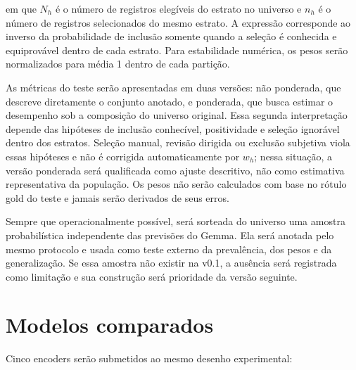 em que $N_h$ é o número de registros elegíveis do estrato no universo e $n_h$
é o número de registros selecionados do mesmo estrato. A expressão corresponde
ao inverso da probabilidade de inclusão somente quando a seleção é conhecida e
equiprovável dentro de cada estrato. Para estabilidade numérica, os pesos serão
normalizados para média 1 dentro de cada partição.

As métricas do teste serão apresentadas em duas versões: não ponderada, que
descreve diretamente o conjunto anotado, e ponderada, que busca estimar o
desempenho sob a composição do universo original. Essa segunda interpretação
depende das hipóteses de inclusão conhecível, positividade e seleção ignorável
dentro dos estratos. Seleção manual, revisão dirigida ou exclusão subjetiva
viola essas hipóteses e não é corrigida automaticamente por $w_h$; nessa situação,
a versão ponderada será qualificada como ajuste descritivo, não como estimativa
representativa da população. Os pesos não serão calculados com base no rótulo
gold do teste e jamais serão derivados de seus erros.

Sempre que operacionalmente possível, será sorteada do universo uma amostra
probabilística independente das previsões do Gemma. Ela será anotada pelo mesmo
protocolo e usada como teste externo da prevalência, dos pesos e da generalização.
Se essa amostra não existir na v0.1, a ausência será registrada como limitação e
sua construção será prioridade da versão seguinte.

\section{Modelos comparados}
\label{sec:modelos-comparados}

Cinco encoders serão submetidos ao mesmo desenho experimental:

